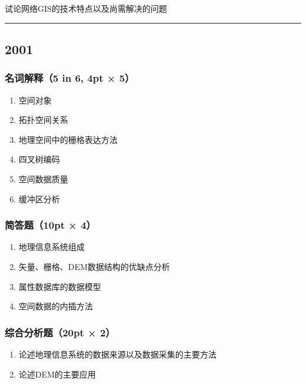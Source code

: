 \documentclass[]{article}
\begin{document}
试论网络GIS的技术特点以及尚需解决的问题

\begin{center}\rule{0.5\linewidth}{\linethickness}\end{center}

\hypertarget{header-n104}{%
\subsection{2001}\label{header-n104}}

\hypertarget{header-n105}{%
\subsubsection{名词解释（5 in 6, 4pt × 5）}\label{header-n105}}

\begin{enumerate}
\def\labelenumi{\arabic{enumi}.}
\item
  空间对象
\item
  拓扑空间关系
\item
  地理空间中的栅格表达方法
\item
  四叉树编码
\item
  空间数据质量
\item
  缓冲区分析
\end{enumerate}

\hypertarget{header-n119}{%
\subsubsection{简答题（10pt × 4）}\label{header-n119}}

\begin{enumerate}
\def\labelenumi{\arabic{enumi}.}
\item
  地理信息系统组成
\item
  矢量、栅格、DEM数据结构的优缺点分析
\item
  属性数据库的数据模型
\item
  空间数据的内插方法
\end{enumerate}

\hypertarget{header-n129}{%
\subsubsection{综合分析题（20pt × 2）}\label{header-n129}}

\begin{enumerate}
\def\labelenumi{\arabic{enumi}.}
\item
  论述地理信息系统的数据来源以及数据采集的主要方法
\item
  论述DEM的主要应用
\end{enumerate}
\end{document}
